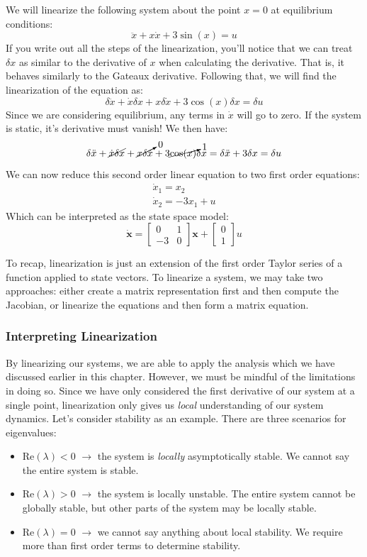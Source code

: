 \begin{example}
We will linearize the following system about the point $x=0$ at equilibrium conditions:
$$\ddot{x}+x\dot{x}+3\sin(x)=u$$
If you write out all the steps of the linearization, you'll notice that we can treat $\delta x$ as similar to the derivative of $x$ when calculating the derivative. That is, it behaves similarly to the Gateaux derivative. Following that, we will find the linearization of the equation as:
$$\delta \ddot{x}+\dot{x}\delta{x}+x\delta\dot{x}+3\cos(x)\delta x=\delta u$$
Since we are considering equilibrium, any terms in $\dot{x}$ will go to zero. If the system is static, it's derivative must vanish! We then have:
$$\delta \ddot{x}+\cancel{\dot{x}\delta{x}}+\cancelto{0}{x\delta\dot{x}}+3\cancelto{1}{\cos(x)}\delta x = \delta \ddot{x}+3\delta x=\delta u$$
We can now reduce this second order linear equation to two first order equations:
\begin{gather}
\dot{x}_1=x_2\\
\dot{x}_2=-3x_1+u
\end{gather}
Which can be interpreted as the state space model:
$$\bm{\dot{x}}=\begin{bmatrix}
0&1\\-3&0
\end{bmatrix}\bm{x}+\begin{bmatrix}
    0\\1
\end{bmatrix}u$$
\end{example}

To recap, linearization is just an extension of the first order Taylor series of a function applied to state vectors. To linearize a system, we may take two approaches: either create a matrix representation first and then compute the Jacobian, or linearize the equations and then form a matrix equation.

\subsubsection{Interpreting Linearization}
By linearizing our systems, we are able to apply the analysis which we have discussed earlier in this chapter. However, we must be mindful of the limitations in doing so. Since we have only considered the first derivative of our system at a single point, linearization only gives us \textit{local} understanding of our system dynamics. Let's consider stability as an example. There are three scenarios for eigenvalues:
\begin{itemize}
    \item  $\text{Re}(\lambda)<0$ $\rightarrow$ the system is \textit{locally} asymptotically stable. We cannot say the entire system is stable.
    \item $\text{Re}(\lambda)>0$ $\rightarrow$ the system is locally unstable. The entire system cannot be globally stable, but other parts of the system may be locally stable.
    \item $\text{Re}(\lambda)=0$ $\rightarrow$ we cannot say anything about local stability. We require more than first order terms to determine stability.
\end{itemize}


